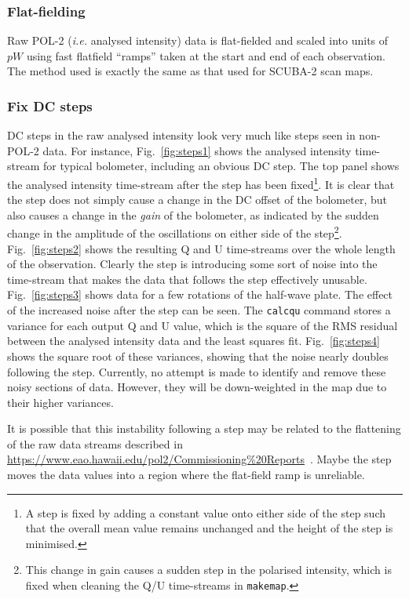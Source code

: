 \documentclass[twoside,11pt]{starlink}
\begin{document}
\subsubsection{Flat-fielding}
Raw POL-2 (\emph{i.e.} analysed  intensity) data is flat-fielded and
scaled into units of $pW$ using fast flatfield ``ramps'' taken at the start
and end of each observation. The method used is exactly the same as that used
for SCUBA-2 scan maps.

\subsubsection{Fix DC steps}
\label{sec:steps}
DC steps in the raw analysed intensity look very much like steps seen in
non-POL-2 data. For instance, Fig.~\ref{fig:steps1} shows the analysed
intensity time-stream for typical bolometer, including an obvious DC
step. The top panel shows the analysed intensity time-stream after the
step has been fixed\footnote{A step is fixed by adding a constant value
onto either side of the step such that the overall mean value remains
unchanged and the height of the step is minimised.}. It is clear that the
step does not simply cause a change in the DC offset of the bolometer, but also
causes a change in the \emph{gain} of the bolometer, as indicated by the
sudden change in the amplitude of the oscillations on either side of the
step\footnote{This change in gain causes a sudden step in the polarised
intensity, which is fixed when cleaning the Q/U time-streams in
\texttt{makemap}.}. Fig.~\ref{fig:steps2} shows the resulting Q and U time-streams over
the whole length of the observation. Clearly the step is introducing some
sort of noise into the time-stream that makes the data that follows the
step effectively unusable. Fig.~\ref{fig:steps3} shows data for a few
rotations of the half-wave plate. The effect of the increased noise after
the step can be seen. The \texttt{calcqu} command stores a variance
for each output Q and U value, which is the square of the RMS residual
between the analysed intensity data and the least squares fit.
Fig.~\ref{fig:steps4} shows the square root of these variances,
showing that the noise nearly doubles following the step. Currently, no
attempt is made to identify and remove these noisy sections of data.
However, they will be down-weighted in the map due to their higher
variances.

It is possible that this instability following a step may be related to
the flattening of the raw data streams described in
\url{https://www.eao.hawaii.edu/pol2/Commissioning%20Reports}~.
Maybe the step moves the data values into a region where the flat-field
ramp is unreliable.
\end{document}
